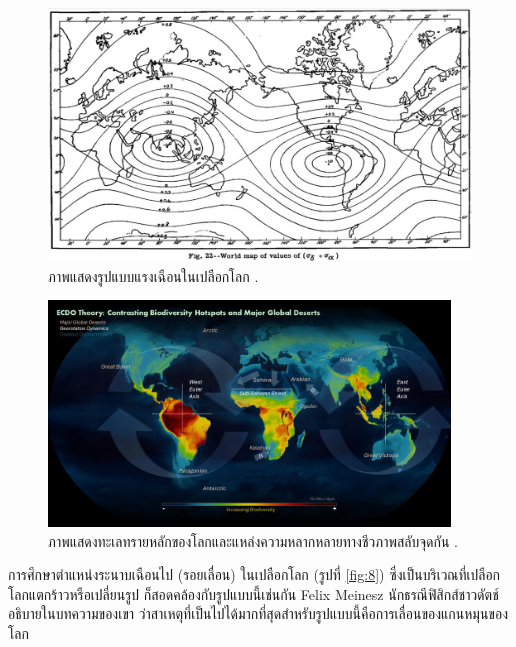 \documentclass[10pt,twocolumn,letterpaper]{article}
\begin{document}
\begin{figure}[t]
\begin{center}
   \includegraphics[width=1\linewidth]{meinesz3.jpg}
\end{center}
   \caption{ภาพแสดงรูปแบบแรงเฉือนในเปลือกโลก \cite{36}.}
\label{fig:8}

\label{fig:onecol}
\end{figure}

\begin{figure}[t]
\begin{center}
\includegraphics[width=0.95\textwidth]{biodiversity.jpg}
\end{center}
   \caption{ภาพแสดงทะเลทรายหลักของโลกและแหล่งความหลากหลายทางชีวภาพสลับจุดกัน \cite{28}.}
\label{fig:9}
\end{figure}

การศึกษาตำแหน่งระนาบเฉือนไป (รอยเลื่อน) ในเปลือกโลก (รูปที่ \ref{fig:8}) ซึ่งเป็นบริเวณที่เปลือกโลกแตกร้าวหรือเปลี่ยนรูป ก็สอดคล้องกับรูปแบบนี้เช่นกัน Felix Meinesz นักธรณีฟิสิกส์ชาวดัตช์ อธิบายในบทความของเขา \cite{36} ว่าสาเหตุที่เป็นไปได้มากที่สุดสำหรับรูปแบบนี้คือการเลื่อนของแกนหมุนของโลก
\end{document}
